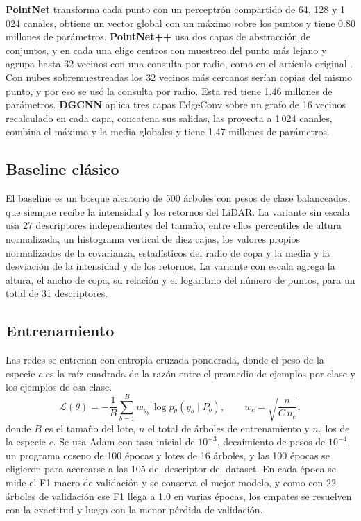 \documentclass[preprint,12pt]{elsarticle}
\begin{document}
\textbf{PointNet} transforma cada punto con un perceptrón compartido de 64, 128 y 1\,024 canales, obtiene un vector global con un máximo sobre los puntos y tiene 0.80 millones de parámetros. \textbf{PointNet++} usa dos capas de abstracción de conjuntos, y en cada una elige centros con muestreo del punto más lejano y agrupa hasta 32 vecinos con una consulta por radio, como en el artículo original \cite{qi2017pointnetpp}. Con nubes sobremuestreadas los 32 vecinos más cercanos serían copias del mismo punto, y por eso se usó la consulta por radio. Esta red tiene 1.46 millones de parámetros. \textbf{DGCNN} aplica tres capas EdgeConv sobre un grafo de 16 vecinos recalculado en cada capa, concatena sus salidas, las proyecta a 1\,024 canales, combina el máximo y la media globales y tiene 1.47 millones de parámetros.

\subsection{Baseline clásico}

El baseline es un bosque aleatorio \cite{breiman2001rf} de 500 árboles con pesos de clase balanceados, que siempre recibe la intensidad y los retornos del LiDAR. La variante sin escala usa 27 descriptores independientes del tamaño, entre ellos percentiles de altura normalizada, un histograma vertical de diez cajas, los valores propios normalizados de la covarianza, estadísticos del radio de copa y la media y la desviación de la intensidad y de los retornos. La variante con escala agrega la altura, el ancho de copa, su relación y el logaritmo del número de puntos, para un total de 31 descriptores.

\subsection{Entrenamiento}

Las redes se entrenan con entropía cruzada ponderada, donde el peso de la especie $c$ es la raíz cuadrada de la razón entre el promedio de ejemplos por clase y los ejemplos de esa clase.
\begin{equation}
\mathcal{L}(\theta) = -\frac{1}{B}\sum_{b=1}^{B} w_{y_b}\,\log \hat{p}_\theta\!\left(y_b \mid P_b\right), \qquad w_c = \sqrt{\frac{n}{C\,n_c}},
\label{eq:loss}
\end{equation}
donde $B$ es el tamaño del lote, $n$ el total de árboles de entrenamiento y $n_c$ los de la especie $c$. Se usa Adam \cite{kingma2015adam} con tasa inicial de $10^{-3}$, decaimiento de pesos de $10^{-4}$, un programa coseno de 100 épocas y lotes de 16 árboles, y las 100 épocas se eligieron para acercarse a las 105 del descriptor del dataset. En cada época se mide el F1 macro de validación y se conserva el mejor modelo, y como con 22 árboles de validación ese F1 llega a 1.0 en varias épocas, los empates se resuelven con la exactitud y luego con la menor pérdida de validación.
\end{document}
